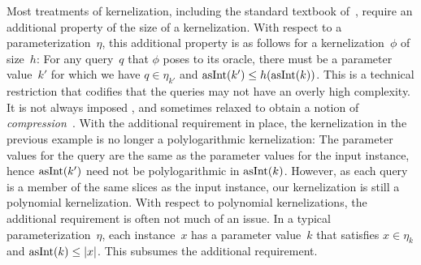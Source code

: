 Most treatments of kernelization, including the standard textbook of~\textcite{fomin2019kernelization}, require an additional property of the size of a kernelization.
With respect to a parameterization~$\eta$, this additional property is as follows for a kernelization~$\phi$ of size~$h$:
For any query~$q$ that $\phi$ poses to its oracle, there must be a parameter value~$k'$ for which we have $q \in \eta_{k'}$ and $\operatorname{asInt}(k') \le h(\operatorname{asInt}(k))$.
This is a technical restriction that codifies that the queries may not have an overly high complexity.
It is not always imposed \parencite[e.g.][]{flum2006parameterized}, and sometimes relaxed to obtain a notion of \emph{compression}~\parencite{bodlaender2014kernelization}.
With the additional requirement in place, the kernelization in the previous example is no longer a polylogarithmic kernelization:
The parameter values for the query are the same as the parameter values for the input instance, hence $\operatorname{asInt}(k')$ need not be polylogarithmic in $\operatorname{asInt}(k)$.
However, as each query is a member of the same slices as the input instance, our kernelization is still a polynomial kernelization.
With respect to polynomial kernelizations, the additional requirement is often not much of an issue.
In a typical parameterization~$\eta$, each instance~$x$ has a parameter value~$k$ that satisfies $x \in \eta_k$ and $\operatorname{asInt}(k) \le {\lvert x\rvert}$.
This subsumes the additional requirement.

